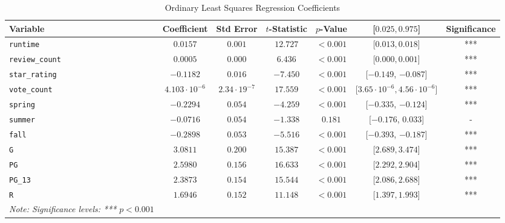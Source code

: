 \documentclass{article}
\begin{document}
\begin{table}[ht]
    \centering
    \caption{Ordinary Least Squares Regression Coefficients}
    \scriptsize
    \begin{tabular}{lcccccc}
        \toprule
        \textbf{Variable} & \textbf{Coefficient} & \textbf{Std Error} & \textbf{$t$-Statistic} & \textbf{$p$-Value} & \textbf{[$0.025, 0.975$]} & \textbf{Significance} \\
        \midrule
        \texttt{runtime} & $0.0157$ & $0.001$ & $12.727$ & $<0.001$ & [$0.013, 0.018$] & *** \\
        \texttt{review\_count} & $0.0005$ & $0.000$ & $6.436$ & $<0.001$ & [$0.000, 0.001$] & *** \\
        \texttt{star\_rating} & $-0.1182$ & $0.016$ & $-7.450$ & $<0.001$ & [$-0.149$, $-0.087$] & *** \\
        \texttt{vote\_count} & $4.103\cdot 10^{-6}$ & $2.34\cdot19^{-7}$ & $17.559$ & $<0.001$ & [$3.65\cdot10^{-6}, 4.56\cdot 10^{-6}$] & *** \\
        \texttt{spring} & $-0.2294$ & $0.054$ & $-4.259$ & $<0.001$ & [$-0.335$, $-0.124$] & *** \\
        \texttt{summer} & $-0.0716$ & $0.054$ & $-1.338$ & $0.181$ & [$-0.176$, $0.033$] & - \\
        \texttt{fall} & $-0.2898$ & $0.053$ & $-5.516$ & $<0.001$ & [$-0.393$, $-0.187$] & *** \\
        \texttt{G} & $3.0811$ & $0.200$ & $15.387$ & $<0.001$ & [$2.689, 3.474$] & *** \\
        \texttt{PG} & $2.5980$ & $0.156$ & $16.633$ & $<0.001$ & [$2.292, 2.904$] & *** \\
        \texttt{PG\_13} & $2.3873$ & $0.154$ & $15.544$ & $<0.001$ & [$2.086, 2.688$] & *** \\
        \texttt{R} & $1.6946$ & $0.152$ & $11.148$ & $<0.001$ & [$1.397, 1.993$] & *** \\
        \bottomrule
        
        \textit{Note: Significance levels: ***} $p<0.001$
    \end{tabular}
    \label{tab:ols_results}
\end{table}
\end{document}
